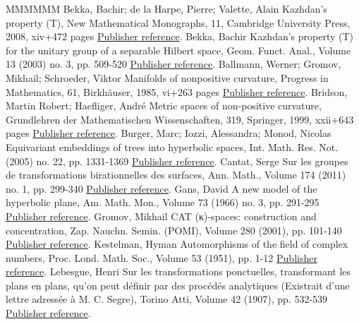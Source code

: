 \documentclass[11pt]{article}
\theoremstyle{definition}
\numberwithin{equation}{section}
\numberwithin{figure}{section}
\numberwithin{table}{section}
\begin{document}
\begin{thebibliography}{MMMMMM}
 Bekka, Bachir; de la Harpe, Pierre; Valette, Alain Kazhdan’s property (T), New Mathematical Monographs, 11, Cambridge University Press, 2008, xiv+472 pages \href{https://ahl.centre-mersenne.org/item/AHL_2019__2__259_0/#Bekka-Harpe-Valette}{Publisher reference}.
 Bekka, Bachir Kazhdan’s property (T) for the unitary group of a separable Hilbert space, Geom. Funct. Anal., Volume 13 (2003) no. 3, pp. 509-520 \href{https://ahl.centre-mersenne.org/item/AHL_2019__2__259_0/#Bekka03}{Publisher reference}.
 Ballmann, Werner; Gromov, Mikhail; Schroeder, Viktor Manifolds of nonpositive curvature, Progress in Mathematics, 61, Birkhäuser, 1985, vi+263 pages \href{https://ahl.centre-mersenne.org/item/AHL_2019__2__259_0/#Ballmann-Gromov-Schroeder}{Publisher reference}.
 Bridson, Martin Robert; Haefliger, André Metric spaces of non-positive curvature, Grundlehren der Mathematischen Wissenschaften, 319, Springer, 1999, xxii+643 pages \href{https://ahl.centre-mersenne.org/item/AHL_2019__2__259_0/#Bridson-Haefliger}{Publisher reference}.
 Burger, Marc; Iozzi, Alessandra; Monod, Nicolas Equivariant embeddings of trees into hyperbolic spaces, Int. Math. Res. Not. (2005) no. 22, pp. 1331-1369 \href{https://ahl.centre-mersenne.org/item/AHL_2019__2__259_0/#Burger-Iozzi-Monod}{Publisher reference}.
 Cantat, Serge Sur les groupes de transformations birationnelles des surfaces, Ann. Math., Volume 174 (2011) no. 1, pp. 299-340 \href{https://ahl.centre-mersenne.org/item/AHL_2019__2__259_0/#Cantat}{Publisher reference}.
 Gans, David A new model of the hyperbolic plane, Am. Math. Mon., Volume 73 (1966) no. 3, pp. 291-295 \href{https://ahl.centre-mersenne.org/item/AHL_2019__2__259_0/#Gans66}{Publisher reference}.
 Gromov, Mikhail  CAT (κ)-spaces: construction and concentration, Zap. Nauchn. Semin. (POMI), Volume 280 (2001), pp. 101-140 \href{https://ahl.centre-mersenne.org/item/AHL_2019__2__259_0/#Gromov_conc}{Publisher reference}.
 Kestelman, Hyman Automorphisms of the field of complex numbers, Proc. Lond. Math. Soc., Volume 53 (1951), pp. 1-12 \href{https://ahl.centre-mersenne.org/item/AHL_2019__2__259_0/#Kestelman51}{Publisher reference}.
 Lebesgue, Henri Sur les transformations ponctuelles, transformant les plans en plans, qu’on peut définir par des procédés analytiques (Existrait d’une lettre adressée à M. C. Segre), Torino Atti, Volume 42 (1907), pp. 532-539 \href{https://ahl.centre-mersenne.org/item/AHL_2019__2__259_0/#Lebesgue07}{Publisher reference}.

\end{thebibliography}
\end{document}
